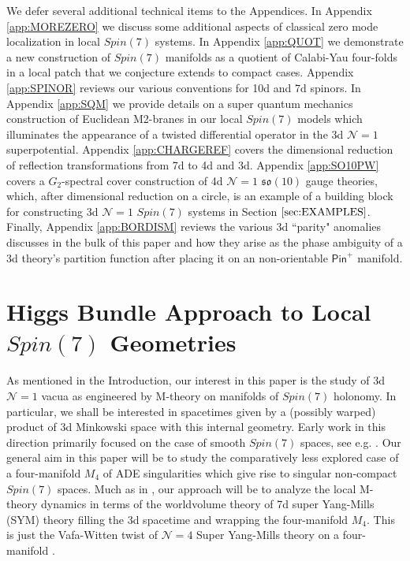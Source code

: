 \documentclass[12pt]{article}%
\numberwithin{equation}{section}
\renewcommand{\(}{\left(}
\renewcommand{\)}{\right)}
\renewcommand{\[}{\left[}
\renewcommand{\]}{\right]}
\begin{document}
We defer several additional technical items to the Appendices. In Appendix \ref{app:MOREZERO} we discuss some additional aspects of classical zero mode localization in local $Spin(7)$ systems. In Appendix \ref{app:QUOT} we demonstrate a new construction of $Spin(7)$ manifolds as a quotient of Calabi-Yau four-folds in a local patch that we conjecture extends to compact cases. Appendix \ref{app:SPINOR} reviews our various conventions for 10d and 7d spinors. In Appendix \ref{app:SQM} we provide details on a super quantum mechanics construction of Euclidean M2-branes in our local $Spin(7)$ models which illuminates the appearance of a twisted differential operator in the 3d $\mathcal{N}=1$ superpotential. Appendix \ref{app:CHARGEREF} covers the dimensional reduction of reflection transformations from 7d to 4d and 3d.  Appendix \ref{app:SO10PW} covers a $G_2$-spectral cover construction of 4d $\mathcal{N}=1$ $\mathfrak{so}(10)$ gauge theories, which, after dimensional reduction on a circle, is an example of a building block for constructing 3d $\mathcal{N}=1$ $Spin(7)$ systems in Section $\ref{sec:EXAMPLES}$. Finally, Appendix \ref{app:BORDISM} reviews the various 3d ``parity" anomalies discusses in the bulk of this paper and how they arise as the phase ambiguity of a 3d theory's partition function after placing it on an non-orientable $\mathsf{Pin}^+$ manifold.

\section{Higgs Bundle Approach to Local $Spin(7)$ Geometries \label{sec:Spin7Review}}

As mentioned in the Introduction, our interest in this paper is the study of 3d $\mathcal{N} = 1$ vacua
as engineered by M-theory on manifolds of $Spin(7)$ holonomy. In particular, we shall be interested in
spacetimes given by a (possibly warped) product of 3d Minkowski space with this internal geometry. Early work in this direction
primarily focused on the case of smooth $Spin(7)$ spaces, see e.g. \cite{Becker:2000jc, Gukov:2001hf, Gukov:2002zg}. Our general aim in this paper will be to study the comparatively less explored case of a four-manifold $M_4$ of ADE singularities which give rise to singular non-compact $Spin(7)$ spaces. Much as in \cite{Heckman:2018mxl}, our approach will be to analyze the local M-theory dynamics in terms of the worldvolume theory of 7d super Yang-Mills (SYM) theory filling the 3d spacetime and wrapping the four-manifold $M_4$.
This is just the Vafa-Witten twist of $\mathcal{N} = 4$ Super Yang-Mills theory on a four-manifold \cite{Vafa:1994tf}.
\end{document}
